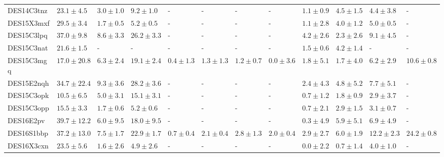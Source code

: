 \documentclass[fleqn,usenatbib,]{mnras}
\begin{document}
\begin{table}
\begin{tabular}{llllllllllll}
DES14C3tnz &   $23.1 \pm 4.5$ &    $3.0 \pm 1.0$ &     $9.2 \pm 1.0$ &               - &               - &               - &               - &   $1.1 \pm 0.9$ &    $4.5 \pm 1.5$ &    $4.4 \pm 3.8$ &                - \\
DES15X3mxf &   $29.5 \pm 3.4$ &    $1.7 \pm 0.5$ &     $5.2 \pm 0.5$ &               - &               - &               - &               - &   $1.1 \pm 2.8$ &    $4.0 \pm 1.2$ &    $5.0 \pm 0.5$ &                - \\
DES15C3lpq &   $37.0 \pm 9.8$ &    $8.6 \pm 3.3$ &    $26.2 \pm 3.3$ &               - &               - &               - &               - &   $4.2 \pm 2.6$ &    $2.3 \pm 2.6$ &    $9.1 \pm 4.5$ &                - \\
DES15C3nat &   $21.6 \pm 1.5$ &                - &                 - &               - &               - &               - &               - &   $1.5 \pm 0.6$ &    $4.2 \pm 1.4$ &                - &                - \\
DES15C3mgq &  $17.0 \pm 20.8$ &    $6.3 \pm 2.4$ &    $19.1 \pm 2.4$ &   $0.4 \pm 1.3$ &   $1.3 \pm 1.3$ &   $1.2 \pm 0.7$ &   $0.0 \pm 3.6$ &   $1.8 \pm 5.1$ &    $1.7 \pm 4.0$ &    $6.2 \pm 2.9$ &   $10.6 \pm 0.8$ \\
DES15E2nqh &  $34.7 \pm 22.4$ &    $9.3 \pm 3.6$ &    $28.2 \pm 3.6$ &               - &               - &               - &               - &   $2.4 \pm 4.3$ &    $4.8 \pm 5.2$ &    $7.7 \pm 5.1$ &                - \\
DES15C3opk &   $10.5 \pm 6.5$ &    $5.0 \pm 3.1$ &    $15.1 \pm 3.1$ &               - &               - &               - &               - &   $0.7 \pm 1.2$ &    $1.8 \pm 0.9$ &    $2.9 \pm 3.7$ &                - \\
DES15C3opp &   $15.5 \pm 3.3$ &    $1.7 \pm 0.6$ &     $5.2 \pm 0.6$ &               - &               - &               - &               - &   $0.7 \pm 2.1$ &    $2.9 \pm 1.5$ &    $3.1 \pm 0.7$ &                - \\
DES16E2pv  &  $39.7 \pm 12.2$ &    $6.0 \pm 9.5$ &    $18.0 \pm 9.5$ &               - &               - &               - &               - &   $0.3 \pm 4.9$ &    $5.9 \pm 5.1$ &    $6.9 \pm 4.9$ &                - \\
DES16S1bbp &  $37.2 \pm 13.0$ &    $7.5 \pm 1.7$ &    $22.9 \pm 1.7$ &   $0.7 \pm 0.4$ &   $2.1 \pm 0.4$ &   $2.8 \pm 1.3$ &   $2.0 \pm 0.4$ &   $2.9 \pm 2.7$ &    $6.0 \pm 1.9$ &   $12.2 \pm 2.3$ &   $24.2 \pm 0.8$ \\
DES16X3cxn &   $23.5 \pm 5.6$ &    $1.6 \pm 2.6$ &     $4.9 \pm 2.6$ &               - &               - &               - &               - &   $0.0 \pm 2.2$ &    $0.7 \pm 1.4$ &    $4.0 \pm 1.0$ &                - \\

\end{tabular}
\end{table}
\end{document}
